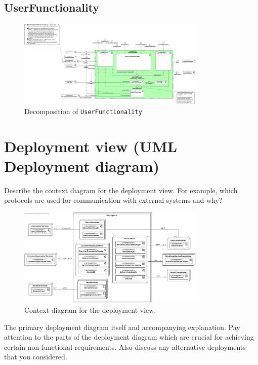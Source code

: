 \documentclass[a4paper,10pt]{article}
\begin{document}
\subsection{UserFunctionality}
\begin{figure}[!htp]
	\centering
	\includegraphics[width=0.8\textwidth]{UserFunctionality.png}
	\caption{Decomposition of \texttt{UserFunctionality}}
	\label{fig:decomp-UserFunctionality}
\end{figure}

\section{Deployment view (UML Deployment diagram)}\label{sec:deployment}
Describe the context diagram for the deployment view.
For example, which protocols are used for communication with external systems
and why?

\begin{figure}[!htp]
	\centering
	\includegraphics[width=0.8\textwidth]{ContextDeployment.png}
    \caption{Context diagram for the deployment view.}
    \label{fig:depl_context}
\end{figure}

The primary deployment diagram itself and accompanying explanation.
Pay attention to the parts of the deployment diagram which are crucial for
achieving certain non-functional requirements.
Also discuss any alternative deployments that you considered.
\end{document}
